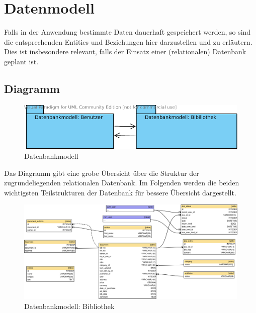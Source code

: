 \chapter{Datenmodell}
\label{kap4}
Falls in der Anwendung bestimmte Daten dauerhaft gespeichert werden, so sind
die entsprechenden Entities und Beziehungen hier darzustellen und zu erläutern.
Dies ist insbesondere relevant, falls der Einsatz einer (relationalen)
Datenbank geplant ist.

\section{Diagramm}


\begin{figure}[H]
\includegraphics[width=1.0\linewidth]{bilder/db_wirelib-packages.pdf}
\caption{Datenbankmodell}
\label{fig:DBDiagramm}
\end{figure}

Das Diagramm gibt eine grobe Übersicht über die Struktur der zugrundeliegenden
relationalen Datenbank. Im Folgenden werden die beiden wichtigsten
Teilstrukturen der Datenbank für bessere Übersicht dargestellt.


\begin{figure}[H]
\includegraphics[width=1.0\linewidth]{bilder/database-wirelib_cluster-doc.pdf}
\caption{Datenbankmodell: Bibliothek}
\label{fig:DB_docDiagramm}
\end{figure}

